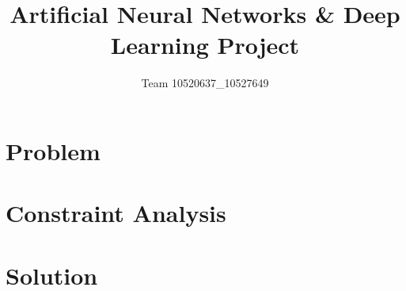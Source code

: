\documentclass{article}
\title{Artificial Neural Networks \& Deep Learning
Project}
\author{Team 10520637\_10527649}
\begin{document}
	\maketitle

	\section{Problem}
		
	\section{Constraint Analysis}
		
	\section{Solution}
	
\end{document}
